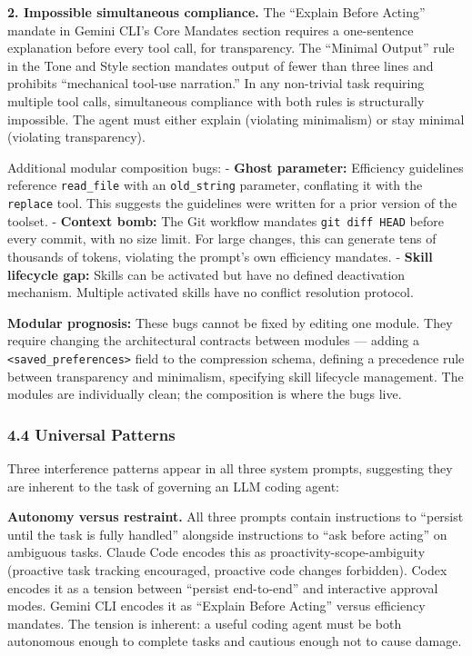 \documentclass[
]{article}
\begin{document}
\textbf{2. Impossible simultaneous compliance.} The ``Explain Before
Acting'' mandate in Gemini CLI's Core Mandates section requires a
one-sentence explanation before every tool call, for transparency. The
``Minimal Output'' rule in the Tone and Style section mandates output of
fewer than three lines and prohibits ``mechanical tool-use narration.''
In any non-trivial task requiring multiple tool calls, simultaneous
compliance with both rules is structurally impossible. The agent must
either explain (violating minimalism) or stay minimal (violating
transparency).

Additional modular composition bugs: - \textbf{Ghost parameter:}
Efficiency guidelines reference \texttt{read\_file} with an
\texttt{old\_string} parameter, conflating it with the \texttt{replace}
tool. This suggests the guidelines were written for a prior version of
the toolset. - \textbf{Context bomb:} The Git workflow mandates
\texttt{git\ diff\ HEAD} before every commit, with no size limit. For
large changes, this can generate tens of thousands of tokens, violating
the prompt's own efficiency mandates. - \textbf{Skill lifecycle gap:}
Skills can be activated but have no defined deactivation mechanism.
Multiple activated skills have no conflict resolution protocol.

\textbf{Modular prognosis:} These bugs cannot be fixed by editing one
module. They require changing the architectural contracts between
modules --- adding a
\texttt{\textless{}saved\_preferences\textgreater{}} field to the
compression schema, defining a precedence rule between transparency and
minimalism, specifying skill lifecycle management. The modules are
individually clean; the composition is where the bugs live.

\hypertarget{universal-patterns}{%
\subsubsection{4.4 Universal Patterns}\label{universal-patterns}}

Three interference patterns appear in all three system prompts,
suggesting they are inherent to the task of governing an LLM coding
agent:

\textbf{Autonomy versus restraint.} All three prompts contain
instructions to ``persist until the task is fully handled'' alongside
instructions to ``ask before acting'' on ambiguous tasks. Claude Code
encodes this as proactivity-scope-ambiguity (proactive task tracking
encouraged, proactive code changes forbidden). Codex encodes it as a
tension between ``persist end-to-end'' and interactive approval modes.
Gemini CLI encodes it as ``Explain Before Acting'' versus efficiency
mandates. The tension is inherent: a useful coding agent must be both
autonomous enough to complete tasks and cautious enough not to cause
damage.
\end{document}
